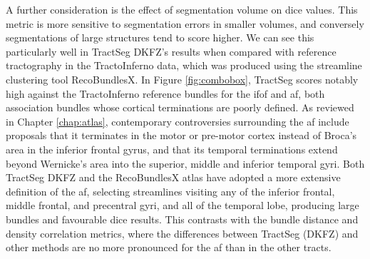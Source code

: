 A further consideration is the effect of segmentation volume on \gls{dice} values.
This metric is more sensitive to segmentation errors in smaller volumes, and conversely segmentations of large structures tend to score higher.
We can see this particularly well in TractSeg DKFZ's results when compared with reference tractography in the TractoInferno data, which was produced using the streamline clustering tool RecoBundlesX\autocite{Garyfallidis2018,Rheault2020a}.
In Figure \ref{fig:combobox}, TractSeg scores notably high against the TractoInferno reference bundles for the \gls{ifof} and \gls{af}, both association bundles whose cortical terminations are poorly defined.
As reviewed in Chapter \ref{chap:atlas}, contemporary controversies surrounding the \gls{af} include proposals that it terminates in the motor or pre-motor cortex instead of Broca's area in the inferior frontal gyrus, and that its temporal terminations extend beyond Wernicke's area into the superior, middle and inferior temporal gyri\autocite{Dick2012,Giampiccolo2022a}.
Both TractSeg DKFZ\autocite{Wasserthal2018c} and the RecoBundlesX atlas\autocite{Rheault2021} have adopted a more extensive definition of the \gls{af}, selecting streamlines visiting any of the inferior frontal, middle frontal, and precentral gyri, and all of the temporal lobe, producing large bundles and favourable \gls{dice} results.
This contrasts with the bundle distance and density correlation metrics, where the differences between TractSeg (DKFZ) and other methods are no more pronounced for the \gls{af} than in the other tracts.

